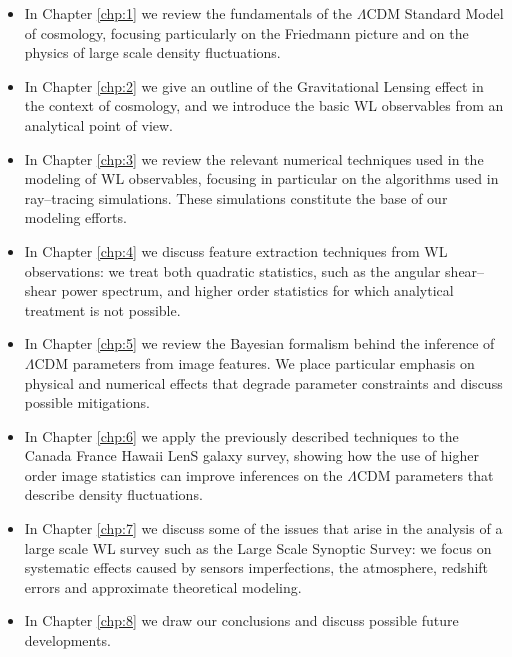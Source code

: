 \begin{itemize}

	\item In Chapter \ref{chp:1} we review the fundamentals of the $\Lambda$CDM Standard Model of cosmology, focusing particularly on the Friedmann picture and on the physics of large scale density fluctuations.
	
	\item In Chapter \ref{chp:2} we give an outline of the Gravitational Lensing effect in the context of cosmology, and we introduce the basic WL observables from an analytical point of view.
	
	\item In Chapter \ref{chp:3} we review the relevant numerical techniques used in the modeling of WL observables, focusing in particular on the algorithms used in ray--tracing simulations. These simulations constitute the base of our modeling efforts.  
	
	\item In Chapter \ref{chp:4} we discuss feature extraction techniques from WL observations: we treat both quadratic statistics, such as the angular shear--shear power spectrum, and higher order statistics for which analytical treatment is not possible.
	
	\item In Chapter \ref{chp:5} we review the Bayesian formalism behind the inference of $\Lambda$CDM parameters from image features. We place particular emphasis on physical and numerical effects that degrade parameter constraints and discuss possible mitigations.
	
	\item In Chapter \ref{chp:6} we apply the previously described techniques to the Canada France Hawaii LenS galaxy survey, showing how the use of higher order image statistics can improve inferences on the $\Lambda$CDM parameters that describe density fluctuations. 
	
	\item In Chapter \ref{chp:7} we discuss some of the issues that arise in the analysis of a large scale WL survey such as the Large Scale Synoptic Survey: we focus on systematic effects caused by sensors imperfections, the atmosphere, redshift errors and approximate theoretical modeling.
	
	\item In Chapter \ref{chp:8} we draw our conclusions and discuss possible future developments.

\end{itemize}